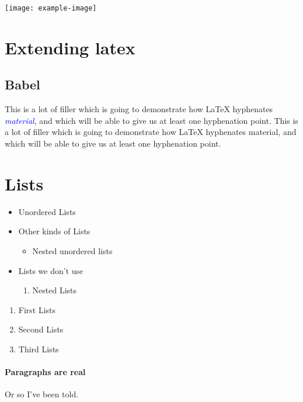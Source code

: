 \documentclass{scrartcl}
\newcommand\kw[1]{\textcolor{blue}{\itshape #1}}
\begin{document}
\begin{center}
    \texttt{[image: example-image]}
\end{center}

\section{Extending latex}

\subsection{Babel}

This is a lot of filler which is going to demonstrate how LaTeX hyphenates
\kw{material}, and which will be able to give us at least one hyphenation point.
This is a lot of filler which is going to demonstrate how LaTeX hyphenates
material, and which will be able to give us at least one hyphenation point.

\section{Lists}
    
\begin{itemize}
    \item Unordered Lists
    \item Other kinds of Lists
    \begin{itemize}
        \item Nested unordered lists
    \end{itemize}
    \item Lists we don't use
    \begin{enumerate}
        \item Nested Lists
    \end{enumerate}
\end{itemize}

\begin{enumerate}
    \item First Lists
    \item Second Lists
    \item Third Lists
\end{enumerate}

\paragraph{Paragraphs are real}

Or so I've been told.
\end{document}
